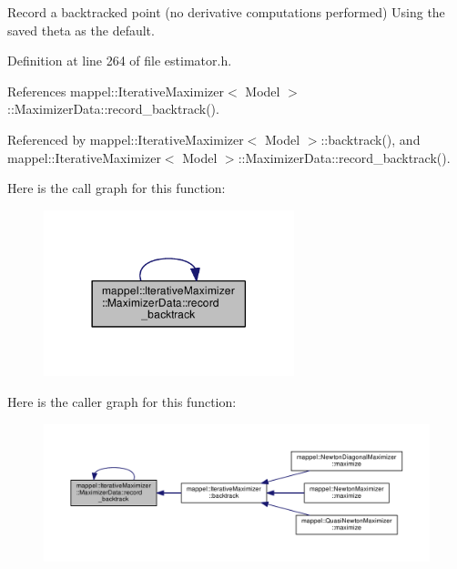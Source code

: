 Record a backtracked point (no derivative computations performed) Using the saved theta as the default. 



Definition at line 264 of file estimator.\+h.



References mappel\+::\+Iterative\+Maximizer$<$ Model $>$\+::\+Maximizer\+Data\+::record\+\_\+backtrack().



Referenced by mappel\+::\+Iterative\+Maximizer$<$ Model $>$\+::backtrack(), and mappel\+::\+Iterative\+Maximizer$<$ Model $>$\+::\+Maximizer\+Data\+::record\+\_\+backtrack().



Here is the call graph for this function\+:\nopagebreak
\begin{figure}[H]
\begin{center}
\leavevmode
\includegraphics[width=206pt]{classmappel_1_1IterativeMaximizer_1_1MaximizerData_a8c82784b23315be8f74b968ee4188388_cgraph}
\end{center}
\end{figure}




Here is the caller graph for this function\+:\nopagebreak
\begin{figure}[H]
\begin{center}
\leavevmode
\includegraphics[width=350pt]{classmappel_1_1IterativeMaximizer_1_1MaximizerData_a8c82784b23315be8f74b968ee4188388_icgraph}
\end{center}
\end{figure}


